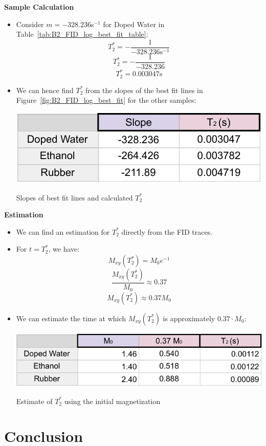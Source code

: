 \documentclass{article}
\begin{document}
\textbf{Sample Calculation}
\begin{itemize}
    \item Consider $m = -328.236$s$^{-1}$ for Doped Water in Table~\ref{tab:B2_FID_log_best_fit_table}:
    \[ T_2^* = -\frac{1}{-328.236\text{s}^{-1}} \]
    \[ T_2^* = -\frac{1}{-328.236}\]
    \[ T_2^* = 0.003047\text{s} \]
    \item We can hence find $T_2^*$ from the slopes of the best fit lines in Figure~\ref{fig:B2_FID_log_best_fit} for the other samples:
    \begin{table}[h]
        \centering
        \includegraphics[scale = 0.78]{./images/B2_T2-crop}
        \caption{Slopes of best fit lines and calculated $T_2^*$}
        \label{tab:B2_FID_log_best_fit_table}
    \end{table}
\end{itemize}
\textbf{Estimation}
\begin{itemize}
    \item We can find an estimation for $T_2^*$ directly from the FID traces.
    \item For $t = T_2^*$, we have:
    \[ M_{xy}(T_2^*) = M_0 e^{-1} \]
    \[ \frac{M_{xy}(T_2^*)}{M_0} \approx 0.37 \]
    \[ M_{xy}(T_2^*) \approx 0.37 M_0 \]
    \item We can estimate the time at which $M_{xy}(T_2^*)$ is approximately $0.37 \cdot M_0$:
    \begin{table}[h]
        \centering
        \includegraphics[scale = 0.78]{./images/B2_slopes_estimate-crop}
        \caption{Estimate of $T_2^*$ using the initial magnetization}
        \label{tab:B2_FID_log_best_fit_table_estimate}
    \end{table}
\end{itemize}

\newpage

\section{Conclusion}\label{sec:conclusion}
\end{document}
